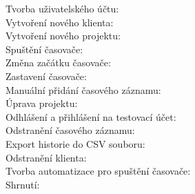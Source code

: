 \begin{description}
\item[Tvorba uživatelského účtu:] 
\item[Vytvoření nového klienta:] 
\item[Vytvoření nového projektu:]
\item[Spuštění časovače:] 
\item[Změna začátku časovače:]
\item[Zastavení časovače:]
\item[Manuální přidání časového záznamu:]
\item[Úprava projektu:]
\item[Odhlášení a přihlášení na testovací účet:]
\item[Odstranění časového záznamu:]
\item[Export historie do CSV souboru:]
\item[Odstranění klienta:]
\item[Tvorba automatizace pro spuštění časovače:]
\item[Shrnutí:]
\end{description}





















































